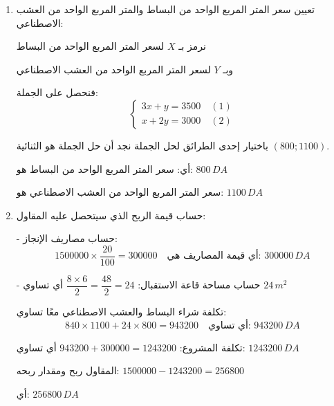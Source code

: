 \documentclass[12pt,a4paper]{article}
\begin{document}
\begin{enumerate}
\item تعيين سعر المتر المربع الواحد من البساط والمتر المربع الواحد من العشب الاصطناعي:

نرمز بـ $X$ لسعر المتر المربع الواحد من البساط

وبـ $Y$ لسعر المتر المربع الواحد من العشب الاصطناعي

فنحصل على الجملة:
\[
\begin{cases} 3x + y = 3500 \quad (1) \\ x + 2y = 3000 \quad (2) \end{cases}
\]

باختيار إحدى الطرائق لحل الجملة نجد أن حل الجملة هو الثنائية $(800 ; 1100)$.

أي: سعر المتر المربع الواحد من البساط هو: $800\,DA$

سعر المتر المربع الواحد من العشب الاصطناعي هو: $1100\,DA$

\item حساب قيمة الربح الذي سيتحصل عليه المقاول:

- حساب مصاريف الإنجاز:
\[
1500000 \times \frac{20}{100} = 300000 \quad \text{أي قيمة المصاريف هي: } 300000\,DA
\]

- حساب مساحة قاعة الاستقبال: $\dfrac{8 \times 6}{2} = \dfrac{48}{2} = 24$ أي تساوي $24\,m^2$

تكلفة شراء البساط والعشب الاصطناعي معًا تساوي:
\[
840 \times 1100 + 24 \times 800 = 943200 \quad \text{أي تساوي: } 943200\,DA
\]

تكلفة المشروع: $943200 + 300000 = 1243200$ أي تساوي: $1243200\,DA$

المقاول ربح ومقدار ربحه: $1500000 - 1243200 = 256800$

أي: $256800\,DA$
\end{enumerate}
\end{document}
